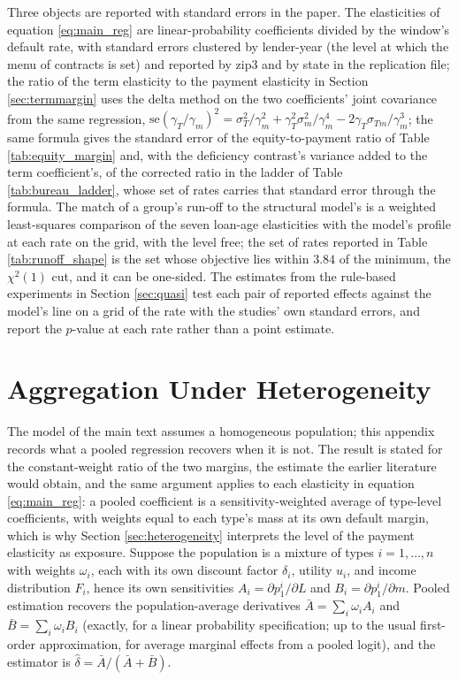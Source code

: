 \documentclass[12pt,english]{article}
\begin{document}
Three objects are reported with standard errors in the paper. The elasticities of equation \eqref{eq:main_reg} are linear-probability coefficients divided by the window's default rate, with standard errors clustered by lender-year (the level at which the menu of contracts is set) and reported by zip3 and by state in the replication file; the ratio of the term elasticity to the payment elasticity in Section \ref{sec:termmargin} uses the delta method on the two coefficients' joint covariance from the same regression, $\mathrm{se}(\gamma_T/\gamma_m)^2 = \sigma_T^2/\gamma_m^2 + \gamma_T^2 \sigma_m^2/\gamma_m^4 - 2\gamma_T \sigma_{Tm}/\gamma_m^3$; the same formula gives the standard error of the equity-to-payment ratio of Table \ref{tab:equity_margin} and, with the deficiency contrast's variance added to the term coefficient's, of the corrected ratio in the ladder of Table \ref{tab:bureau_ladder}, whose set of rates carries that standard error through the formula. The match of a group's run-off to the structural model's is a weighted least-squares comparison of the seven loan-age elasticities with the model's profile at each rate on the grid, with the level free; the set of rates reported in Table \ref{tab:runoff_shape} is the set whose objective lies within $3.84$ of the minimum, the $\chi^2(1)$ cut, and it can be one-sided. The estimates from the rule-based experiments in Section \ref{sec:quasi} test each pair of reported effects against the model's line on a grid of the rate with the studies' own standard errors, and report the $p$-value at each rate rather than a point estimate.





\section{Aggregation Under Heterogeneity}\label{appendix:aggregation}

The model of the main text assumes a homogeneous population; this appendix records what a pooled regression recovers when it is not. The result is stated for the constant-weight ratio of the two margins, the estimate the earlier literature would obtain, and the same argument applies to each elasticity in equation \eqref{eq:main_reg}: a pooled coefficient is a sensitivity-weighted average of type-level coefficients, with weights equal to each type's mass at its own default margin, which is why Section \ref{sec:heterogeneity} interprets the level of the payment elasticity as exposure. Suppose the population is a mixture of types $i = 1,\dots,n$ with weights $\omega_i$, each with its own discount factor $\delta_i$, utility $u_i$, and income distribution $F_i$, hence its own sensitivities $A_i = \partial p_1^i/\partial L$ and $B_i = \partial p_1^i/\partial m$. Pooled estimation recovers the population-average derivatives $\bar A = \sum_i \omega_i A_i$ and $\bar B = \sum_i \omega_i B_i$ (exactly, for a linear probability specification; up to the usual first-order approximation, for average marginal effects from a pooled logit), and the estimator is $\hat\delta = \bar A/(\bar A + \bar B)$.
\end{document}
